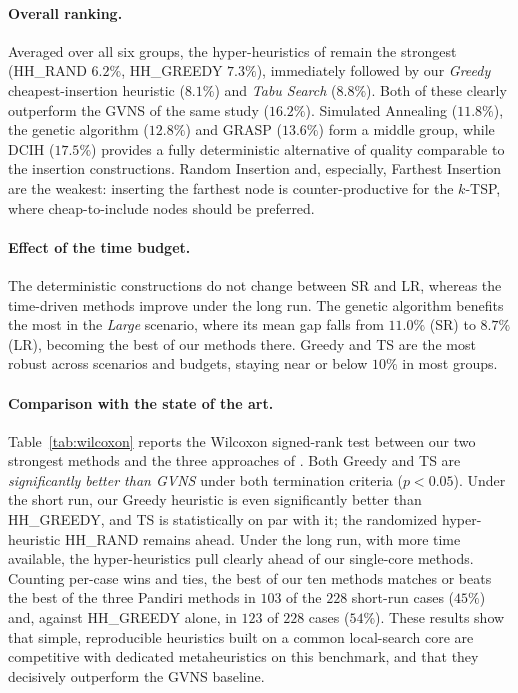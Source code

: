 \paragraph{Overall ranking.} Averaged over all six groups, the hyper-heuristics of
\citet{pandiri2020} remain the strongest (HH\_RAND $6.2\%$, HH\_GREEDY $7.3\%$),
immediately followed by our \emph{Greedy} cheapest-insertion heuristic ($8.1\%$)
and \emph{Tabu Search} ($8.8\%$). Both of these clearly outperform the GVNS of the
same study ($16.2\%$). Simulated Annealing ($11.8\%$), the genetic algorithm
($12.8\%$) and GRASP ($13.6\%$) form a middle group, while DCIH ($17.5\%$) provides
a fully deterministic alternative of quality comparable to the insertion
constructions. Random Insertion and, especially, Farthest Insertion are the weakest:
inserting the farthest node is counter-productive for the $k$-TSP, where cheap-to-include
nodes should be preferred.

\paragraph{Effect of the time budget.} The deterministic constructions do not
change between SR and LR, whereas the time-driven methods improve under the long
run. The genetic algorithm benefits the most in the \emph{Large} scenario, where
its mean gap falls from $11.0\%$ (SR) to $8.7\%$ (LR), becoming the best of our
methods there. Greedy and TS are the most robust across scenarios and budgets,
staying near or below $10\%$ in most groups.

\paragraph{Comparison with the state of the art.} Table~\ref{tab:wilcoxon} reports
the Wilcoxon signed-rank test between our two strongest methods and the three
approaches of \citet{pandiri2020}. Both Greedy and TS are \emph{significantly
better than GVNS} under both termination criteria ($p<0.05$). Under the short run,
our Greedy heuristic is even significantly better than HH\_GREEDY, and TS is
statistically on par with it; the randomized hyper-heuristic HH\_RAND remains ahead.
Under the long run, with more time available, the hyper-heuristics pull clearly
ahead of our single-core methods. Counting per-case wins and ties, the best of our
ten methods matches or beats the best of the three Pandiri methods in $103$ of the
$228$ short-run cases ($45\%$) and, against HH\_GREEDY alone, in $123$ of $228$
cases ($54\%$). These results show that simple, reproducible heuristics built on a
common local-search core are competitive with dedicated metaheuristics on this
benchmark, and that they decisively outperform the GVNS baseline.

